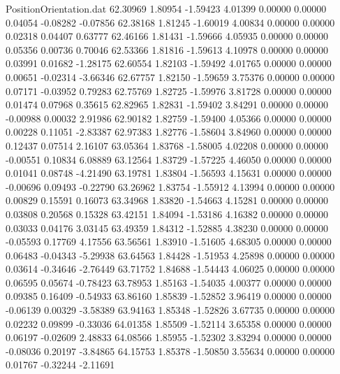 \begin{filecontents}{PositionOrientation.dat}
  62.30969    1.80954   -1.59423     4.01399    0.00000    0.00000    0.04054   -0.08282   -0.07856
  62.38168    1.81245   -1.60019     4.00834    0.00000    0.00000    0.02318    0.04407    0.63777
  62.46166    1.81431   -1.59666     4.05935    0.00000    0.00000    0.05356    0.00736    0.70046
  62.53366    1.81816   -1.59613     4.10978    0.00000    0.00000    0.03991    0.01682   -1.28175
  62.60554    1.82103   -1.59492     4.01765    0.00000    0.00000    0.00651   -0.02314   -3.66346
  62.67757    1.82150   -1.59659     3.75376    0.00000    0.00000    0.07171   -0.03952    0.79283
  62.75769    1.82725   -1.59976     3.81728    0.00000    0.00000    0.01474    0.07968    0.35615
  62.82965    1.82831   -1.59402     3.84291    0.00000    0.00000   -0.00988    0.00032    2.91986
  62.90182    1.82759   -1.59400     4.05366    0.00000    0.00000    0.00228    0.11051   -2.83387
  62.97383    1.82776   -1.58604     3.84960    0.00000    0.00000    0.12437    0.07514    2.16107
  63.05364    1.83768   -1.58005     4.02208    0.00000    0.00000   -0.00551    0.10834    6.08889
  63.12564    1.83729   -1.57225     4.46050    0.00000    0.00000    0.01041    0.08748   -4.21490
  63.19781    1.83804   -1.56593     4.15631    0.00000    0.00000   -0.00696    0.09493   -0.22790
  63.26962    1.83754   -1.55912     4.13994    0.00000    0.00000    0.00829    0.15591    0.16073
  63.34968    1.83820   -1.54663     4.15281    0.00000    0.00000    0.03808    0.20568    0.15328
  63.42151    1.84094   -1.53186     4.16382    0.00000    0.00000    0.03033    0.04176    3.03145
  63.49359    1.84312   -1.52885     4.38230    0.00000    0.00000   -0.05593    0.17769    4.17556
  63.56561    1.83910   -1.51605     4.68305    0.00000    0.00000    0.06483   -0.04343   -5.29938
  63.64563    1.84428   -1.51953     4.25898    0.00000    0.00000    0.03614   -0.34646   -2.76449
  63.71752    1.84688   -1.54443     4.06025    0.00000    0.00000    0.06595    0.05674   -0.78423
  63.78953    1.85163   -1.54035     4.00377    0.00000    0.00000    0.09385    0.16409   -0.54933
  63.86160    1.85839   -1.52852     3.96419    0.00000    0.00000   -0.06139    0.00329   -3.58389
  63.94163    1.85348   -1.52826     3.67735    0.00000    0.00000    0.02232    0.09899   -0.33036
  64.01358    1.85509   -1.52114     3.65358    0.00000    0.00000    0.06197   -0.02609    2.48833
  64.08566    1.85955   -1.52302     3.83294    0.00000    0.00000   -0.08036    0.20197   -3.84865
  64.15753    1.85378   -1.50850     3.55634    0.00000    0.00000    0.01767   -0.32244   -2.11691

\end{filecontents}
